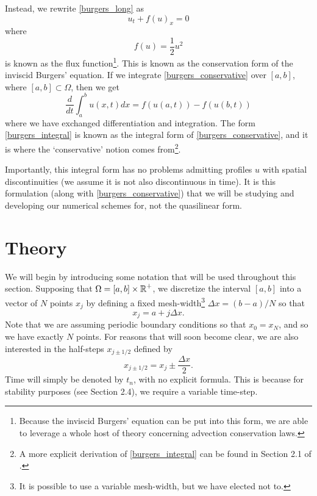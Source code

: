 \documentclass{myproject}
\begin{document}
Instead, we rewrite \eqref{burgers_long} as
\begin{equation}\label{burgers_conservative}
    u_t + f(u)_x = 0
\end{equation}
where
\begin{equation}
    f(u) = \frac{1}{2}u^2
\end{equation}
is known as the flux function\footnote{Because the inviscid Burgers' equation can be put into this form, we are able to leverage a whole host of theory concerning advection conservation laws.}. This is known as the conservation form of the inviscid Burgers' equation. If we integrate \eqref{burgers_conservative} over $[a,b]$, where $[a,b] \subset \Omega$, then we get
\begin{equation}\label{burgers_integral}
    \frac{d}{dt}\int_{a}^{b} u(x,t) dx = f(u(a,t)) - f(u(b,t))
\end{equation}
where we have exchanged differentiation and integration. The form \eqref{burgers_integral} is known as the integral form of \eqref{burgers_conservative}, and it is where the `conservative' notion comes from\footnote{A more explicit derivation of \eqref{burgers_integral} can be found in Section 2.1 of \cite{leveque2002}.}.

Importantly, this integral form has no problems admitting profiles $u$ with spatial discontinuities (we assume it is not also discontinuous in time). It is this formulation (along with \eqref{burgers_conservative}) that we will be studying and developing our numerical schemes for, not the quasilinear form. 

\section{Theory}

We will begin by introducing some notation that will be used throughout this section. Supposing that $\Omega = [a,b]\times\operatorname{\mathbb{R}}^+$, we discretize the interval $[a,b]$ into a vector of $N$ points $x_j$ by defining a fixed mesh-width\footnote{It is possible to use a variable mesh-width, but we have elected not to.} $\Delta x = (b-a)/N$ so that
\begin{equation}
    x_j = a + j\Delta x.
\end{equation}
Note that we are assuming periodic boundary conditions so that $x_0 = x_{N}$, and so we have exactly $N$ points. For reasons that will soon become clear, we are also interested in the half-steps $x_{j\pm1/2}$ defined by
\begin{equation}
    x_{j\pm1/2} = x_j \pm \frac{\Delta x}{2}.
\end{equation}
Time will simply be denoted by $t_n$, with no explicit formula. This is because for stability purposes (see Section 2.4), we require a variable time-step.
\end{document}
